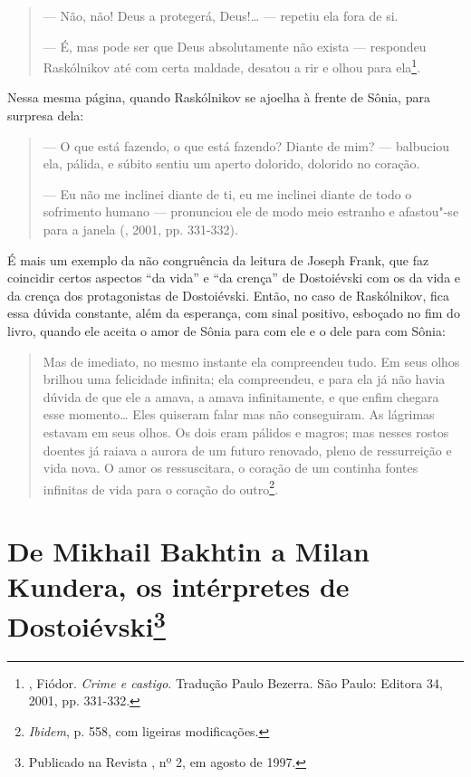 {{\begin{quote}
--- Não, não! Deus a protegerá, Deus!\ldots{} --- repetiu ela fora de si.

--- É, mas pode ser que Deus absolutamente não exista --- respondeu
Raskólnikov até com certa maldade, desatou a rir e olhou para
ela\footnote{, Fiódor. \emph{Crime e castigo}. Tradução
  Paulo Bezerra. São Paulo: Editora 34, 2001, pp. 331-332.}.
\end{quote}

Nessa mesma página, quando Raskólnikov se ajoelha à frente de Sônia,
para surpresa dela:

\begin{quote}
--- O que está fazendo, o que está fazendo? Diante de mim? --- balbuciou
ela, pálida, e súbito sentiu um aperto dolorido, dolorido no coração.

--- Eu não me inclinei diante de ti, eu me inclinei diante de todo o
sofrimento humano --- pronunciou ele de modo meio estranho e afastou"-se
para a janela (, 2001, pp. 331-332).
\end{quote}

É mais um exemplo da não congruência da leitura de Joseph Frank, que faz
coincidir certos aspectos ``da vida'' e ``da crença'' de Dostoiévski com
os da vida e da crença dos protagonistas de Dostoiévski. Então, no caso
de Raskólnikov, fica essa dúvida constante, além da esperança, com sinal
positivo, esboçado no fim do livro, quando ele aceita o amor de Sônia
para com ele e o dele para com Sônia:

\begin{quote}
Mas de imediato, no mesmo instante ela compreendeu tudo. Em seus olhos
brilhou uma felicidade infinita; ela compreendeu, e para ela já não
havia dúvida de que ele a amava, a amava infinitamente, e que enfim
chegara esse momento\ldots{} Eles quiseram falar mas não conseguiram. As
lágrimas estavam em seus olhos. Os dois eram pálidos e magros; mas
nesses rostos doentes já raiava a aurora de um futuro renovado, pleno de
ressurreição e vida nova. O amor os ressuscitara, o coração de um
continha fontes infinitas de vida para o coração do outro\footnote{\emph{Ibidem},
  p. 558, com ligeiras modificações.}.
\end{quote}

\chapter{De Mikhail Bakhtin a Milan Kundera, os intérpretes de
Dostoiévski\footnote{Publicado na Revista , nº 2, em agosto de 1997.}}

}}
